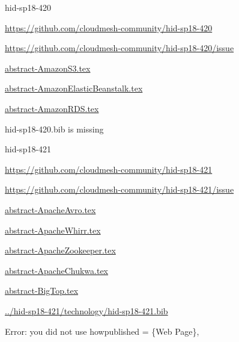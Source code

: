 \begin{IU}

hid-sp18-420

\url{https://github.com/cloudmesh-community/hid-sp18-420}

\url{https://github.com/cloudmesh-community/hid-sp18-420/issue}

\href{https://github.com/cloudmesh-community/hid-sp18-420/blob/master//technology/abstract-AmazonS3.tex}{abstract-AmazonS3.tex}

\href{https://github.com/cloudmesh-community/hid-sp18-420/blob/master//technology/abstract-AmazonElasticBeanstalk.tex}{abstract-AmazonElasticBeanstalk.tex}

\href{https://github.com/cloudmesh-community/hid-sp18-420/blob/master//technology/abstract-AmazonRDS.tex}{abstract-AmazonRDS.tex}

hid-sp18-420.bib is missing

\end{IU}


\begin{IU}

hid-sp18-421

\url{https://github.com/cloudmesh-community/hid-sp18-421}

\url{https://github.com/cloudmesh-community/hid-sp18-421/issue}

\href{https://github.com/cloudmesh-community/hid-sp18-421/blob/master//technology/abstract-ApacheAvro.tex}{abstract-ApacheAvro.tex}

\href{https://github.com/cloudmesh-community/hid-sp18-421/blob/master//technology/abstract-ApacheWhirr.tex}{abstract-ApacheWhirr.tex}

\href{https://github.com/cloudmesh-community/hid-sp18-421/blob/master//technology/abstract-ApacheZookeeper.tex}{abstract-ApacheZookeeper.tex}

\href{https://github.com/cloudmesh-community/hid-sp18-421/blob/master//technology/abstract-ApacheChukwa.tex}{abstract-ApacheChukwa.tex}

\href{https://github.com/cloudmesh-community/hid-sp18-421/blob/master//technology/abstract-BigTop.tex}{abstract-BigTop.tex}

\href{https://github.com/cloudmesh-community/hid-sp18-421/blob/master//technology/hid-sp18-421.bib}{../hid-sp18-421/technology/hid-sp18-421.bib}

Error: you did not use howpublished = \{Web Page\},

\end{IU}


